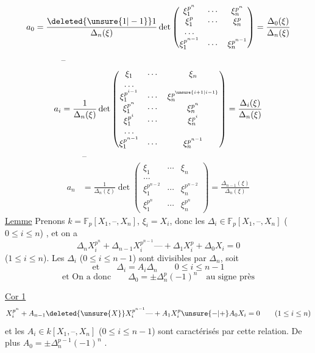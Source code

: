 \[
a_0=\frac{\deleted{\unsure{1|-1}}1}{\Delta_n(\xi)}\det
\begin{pmatrix}\xi_1^{p^n}&\cdots&\xi_n^{p^n}\\\xi_1^p&\cdots&\xi_n^p\\\ldots&&\\\xi_1^{p^{n-1}}&\cdots&\xi_n^{p^{n-1}}\end{pmatrix}
=\frac{\Delta_0(\xi)}{\Delta_n(\xi)}
\]
\[
\begin{aligned}
&\text{--}\\
a_i&=\frac{1}{\Delta_n(\xi)}\det
\begin{pmatrix}
\xi_1&\cdots&\xi_n\\\ldots&&\\
\xi_1^{p^{i-1}}&\cdots&\xi_n^{p^{\unsure{i+1|i-1}}}\\
\xi_1^{p^n}&\cdots&\xi_n^{p^n}\\
\xi_1^{p^{i}}&\cdots&\xi_n^{p^i}\\
\ldots&&\\
\xi_1^{p^{n-1}}&\cdots&\xi_n^{p^{n-1}}
\end{pmatrix}
=\frac{\Delta_i(\xi)}{\Delta_n(\xi)}
\end{aligned}
\]
\[
\begin{aligned}
&\text{--}\\
a_{n}&=\frac{1}{\Delta_n(\xi)}\det
\begin{pmatrix}\xi_1&\cdots&\xi_n\\\ldots&&\\
\xi_1^{p^{n-2}}&\cdots&\xi_n^{p^{n-2}}\\
\xi_1^{p^n}&\cdots&\xi_n^{p^n}\end{pmatrix}
=\frac{\Delta_{n-1}(\xi)}{\Delta_n(\xi)}
\end{aligned}
\]
\uline{Lemme} Prenons $k=\mathbb F_p[X_1,\text{--},X_n]$, $\xi_i=X_i$, donc les  $\Delta_i\in\mathbb F_p[X_1,\text{--},X_n]$ ($0\leq i\leq n$) , et on  a
\[ \Delta_n X_i^{p^n}+\Delta_{n-1}X_i^{p^{n-1}}\text{---}+\Delta_1X_i^p+\Delta_0X_i=0 \]
($1\leq i\leq n$). Les $\Delta_i$ ($0\leq i\leq n-1$) sont divisibles par $\Delta_n$, soit
\[ \text{et}\qquad \Delta_i=A_i\Delta_n \qquad 0\leq i\leq n-1 \]
\[ \text{et On a donc}\qquad \Delta_0=\pm\Delta_n^p(-1)^n\quad\text{au signe près} \]

\uline{Cor 1} 
\[ X_i^{p^n}+A_{n-1}\deleted{\unsure{X}}X_i^{p^{n-1}}\text{---}+A_1X_i^p\unsure{-|+} A_0X_i=0 \qquad (1\leq i\leq n) \]
 et les $A_i\in k[X_1,\text{--},X_n]$ ($0\leq i\leq n-1$) sont caractérisés par cette relation.  De plus $A_0=\pm\Delta_n^{p-1}(-1)^n$ .

